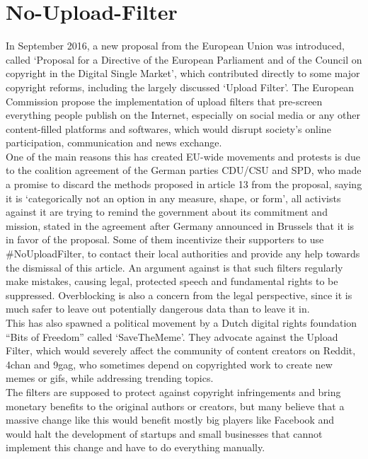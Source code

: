\documentclass[a4paper]{article}
\begin{document}
\newpage
\section{No-Upload-Filter} \label{copyright}  %

In September 2016, a new proposal from the European Union was introduced,  called `Proposal for a Directive of the European Parliament and of the Council on copyright in the Digital Single Market', which contributed directly to some major copyright reforms, including the largely discussed `Upload Filter'. The European Commission propose the implementation of upload filters that pre-screen everything people publish on the Internet, especially on social media or any other content-filled platforms and softwares, which would disrupt society's online participation, communication and news exchange. \\

\noindent
One of the main reasons this has created EU-wide movements and protests is due to the coalition agreement of the German parties CDU/CSU and SPD, who made a promise to discard the methods proposed in article 13 from the proposal, saying it is `categorically not an option in any measure, shape, or form', all activists against it are trying to remind the government about its commitment and mission, stated in the agreement after Germany announced in Brussels that it is in favor of the proposal. Some of them incentivize their supporters to use \#NoUploadFilter, to contact their local authorities and provide any help towards the dismissal of this article. An argument against is that such filters regularly make mistakes, causing legal, protected speech and fundamental rights to be suppressed. Overblocking is also a concern from the legal perspective, since it is much safer to leave out potentially dangerous data than to leave it in. \\

\noindent
This has also spawned a political movement by a Dutch digital rights foundation ``Bits of Freedom'' called `SaveTheMeme'. They advocate against the Upload Filter, which would severely affect the community of content creators on Reddit, 4chan and 9gag, who sometimes depend on copyrighted work to create new memes or gifs, while addressing trending topics. \\

\noindent
The filters are supposed to protect against copyright infringements and bring monetary benefits to the original authors or creators, but many believe that a massive change like this would benefit mostly big players like Facebook and would halt the development of startups and small businesses that cannot implement this change and have to do everything manually. \\
\end{document}

